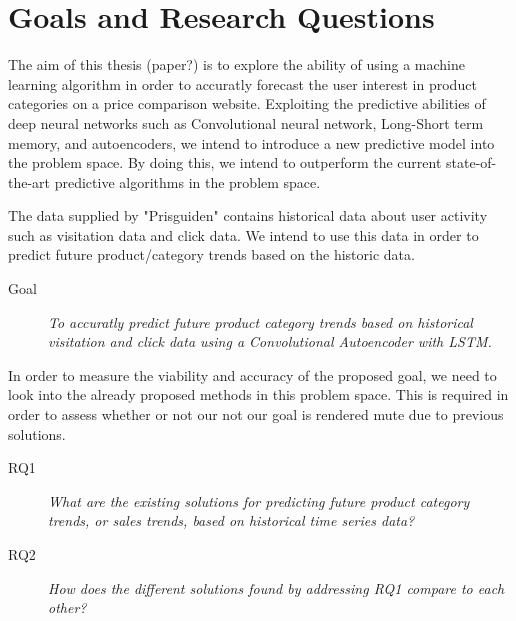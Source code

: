 \section{Goals and Research Questions}
\label{section:Introduction:Goal}

The aim of this thesis (paper?) is to explore the ability of using a machine learning algorithm in order to accuratly forecast the user interest in product categories on a price comparison website.
Exploiting the predictive abilities of deep neural networks such as Convolutional neural network, Long-Short term memory, and autoencoders,
we intend to introduce a new predictive model into the problem space.
By doing this, we intend to outperform the current state-of-the-art predictive algorithms in the problem space.

The data supplied by "Prisguiden" contains historical data about user activity such as visitation data and click data.
We intend to use this data in order to predict future product/category trends based on the historic data.

\begin{description}
    \item[Goal]{\it To accuratly predict future product category trends based on historical visitation and click data using a Convolutional Autoencoder with LSTM.}
\end{description}

In order to measure the viability and accuracy of the proposed goal, we need to look into the already proposed methods in this problem space.
This is required in order to assess whether or not our not our goal is rendered mute due to previous solutions.


\begin{description}
    \item[RQ1]{\it What are the existing solutions for predicting future product category trends, or sales trends, based on historical time series data?}
\end{description}

\begin{description}
    \item[RQ2]{\it How does the different solutions found by addressing RQ1 compare to each other?} 
\end{description}

